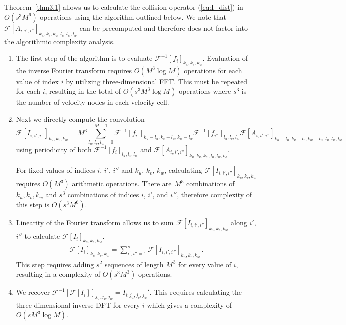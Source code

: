 \documentclass[12pt]{CSUNthesis}
\def\calF{\mathcal{F}}
\begin{document}
Theorem~\ref{thm3.1} allows us to calculate the collision operator 
(\ref{eq:I_dist}) in $O(s^3 M^6)$ operations using the algorithm outlined below. 
We note that $\calF[A_{i,i',i''}]_{k_{u},k_{v},k_{w},l_{u},l_{w},l_{w}}$ 
can be precomputed and therefore does not factor into the algorithmic complexity analysis. 
\begin{enumerate}
	\item The first step of the algorithm is to evaluate $\calF^{-1}[f_i]_{k_u,k_v,k_w}$. Evaluation of the inverse Fourier transform requires $O(M^3 \log M)$ operations for each value of index $i$ by utilizing three-dimensional FFT. This must be repeated for each $i$, resulting in the total of $O(s^3 M^3 \log M)$ operations where $s^3$ is the number of velocity nodes in each velocity cell.
    \item Next we directly compute the convolution
	\begin{equation*}
		\calF [I_{i,i',i''}]_{k_{u},k_{v},k_{w}} = M^3 \sum_{l_{u},l_{v},l_{w}=0}^{M-1} \calF^{-1}[f_{i'}]_{k_{u}-l_{u},k_{v}-l_{v},k_{w}-l_{w}} \calF^{-1}[f_{i''}]_{l_{u},l_{v},l_{w}} \calF[A_{i,i',i''}]_{k_{u}-l_{u},k_{v}-l_{v},k_{w}-l_{w},l_{u},l_{w},l_{w}}\, 
	\end{equation*}
	using periodicity of both $\calF^{-1}[f_{i}]_{l_{u},l_{v},l_{w}}$ 
	and $\calF[A_{i,i',i''}]_{k_{u},k_{v},k_{w},l_{u},l_{w},l_{w}}$. 
	
    For fixed values of indices $i$, $i'$, $i''$ and $k_u$, $k_v$, $k_w$, calculating 
    $\calF [I_{i,i',i''}]_{k_{u},k_{v},k_{w}}$ requires $O(M^3)$ arithmetic operations. 
    There are $M^3$ combinations of $k_u,k_v,k_w$ and $s^3$ combinations of indices  $i$, $i'$, and $i''$, therefore complexity of this step is $O(s^3 M^6)$.

    \item Linearity of the Fourier transform allows us to sum $\calF[I_{i,i',i''}]_{k_u,k_v,k_w}$ along $i'$, $i''$ to calculate $\calF[I_i]_{k_u,k_v,k_w}$. 
    \begin{align*}
    \calF[I_{i}]_{k_{u},k_{v},k_{w}}
= \sum_{i',i''=1}^s \calF[I_{i,i',i''}]_{k_{u},k_{v},k_{w}}\, . 
    \end{align*}
    This step requires adding $s^2$ sequences of length $M^3$ for every value of $i$, resulting in a complexity of $O(s^3 M^3)$ operations. 
    \item We recover $\calF^{-1}[\calF[I_{i}]]_{j_u,j_v,j_w}=I_{i;j_u,j_v,j_w}'$.
    This requires calculating the three-dimensional inverse DFT for every $i$ which gives a complexity of $O(s M^3 \log M)$.
\end{enumerate}
\end{document}
